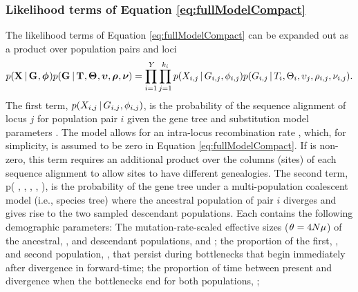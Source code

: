 \subsubsection{Likelihood terms of Equation \ref{eq:fullModelCompact}}
\begin{linenomath}
The likelihood terms of Equation \ref{eq:fullModelCompact} can
be expanded out as a product over population pairs and loci
\begin{equation}
    p(\alignmentVector \given \geneTreeVector, \hkyModelVector)
    p(\geneTreeVector \given \divTimeMapVector, \demographicParamVector,
    \locusMutationRateScalarVector, \ploidyScalarVector,
    \mutationRateScalarConstantVector) = 
    \prod_{i=1}^{\npairs{}}
    \prod_{j=1}^{\nloci{i}}
    p(\alignment{i}{j} \given \geneTree{i}{j}, \hkyModel{i}{j})
    p(\geneTree{i}{j} \given \divTimeMap{i}, \demographicParams{i},
    \locusMutationRateScalar{j}, \ploidyScalar{i}{j},
    \mutationRateScalarConstant{i}{j}).
    \label{eq:modelLikelihoodExpanded}
\end{equation}
The first term,
$p(\alignment{i}{j} \given \geneTree{i}{j}, \hkyModel{i}{j})$,
is the probability of the sequence alignment of locus $j$ for population pair
$i$ given the gene tree and \hky substitution model parameters \cite[i.e., the
``Felsenstein likelihood'';]{Felsenstein1981}.
The model allows for an intra-locus recombination rate \recombinationRate,
which, for simplicity, is assumed to be zero in Equation
\ref{eq:fullModelCompact}.
If \recombinationRate is non-zero, this term requires an additional product
over the columns (sites) of each sequence alignment to allow sites to have
different genealogies.
The second term,
p( \given {}, ,
, ,
),
is the probability of the gene tree under a multi-population coalescent model
(i.e., species tree) where the ancestral population of pair $i$ diverges
and gives rise to the two sampled descendant populations.
Each \demographicParams{} contains the following demographic parameters: The
mutation-rate-scaled effective sizes ($\theta_{} = 4N\mu$) of the
ancestral, \ancestralTheta{}, and descendant populations, 
and ;
the proportion of the first, , and second population,
, that persist during bottlenecks that begin immediately
after divergence in forward-time;
the proportion of time between present and divergence when the bottlenecks
end for both populations, \bottleTime{};

\end{linenomath}
